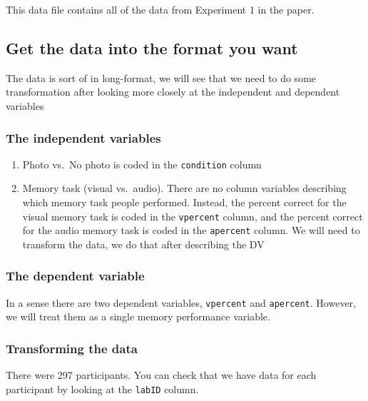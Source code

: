 \documentclass[
]{book}
\providecommand{\tightlist}{%
  \setlength{\itemsep}{0pt}\setlength{\parskip}{0pt}}
\begin{document}
This data file contains all of the data from Experiment 1 in the paper.

\hypertarget{get-the-data-into-the-format-you-want-1}{%
\subsection{Get the data into the format you want}\label{get-the-data-into-the-format-you-want-1}}

The data is sort of in long-format, we will see that we need to do some transformation after looking more closely at the independent and dependent variables

\hypertarget{the-independent-variables-1}{%
\subsubsection{The independent variables}\label{the-independent-variables-1}}

\begin{enumerate}
\def\labelenumi{\arabic{enumi}.}
\tightlist
\item
  Photo vs.~No photo is coded in the \texttt{condition} column
\item
  Memory task (visual vs.~audio). There are no column variables describing which memory task people performed. Instead, the percent correct for the visual memory task is coded in the \texttt{vpercent} column, and the percent correct for the audio memory task is coded in the \texttt{apercent} column. We will need to transform the data, we do that after describing the DV
\end{enumerate}

\hypertarget{the-dependent-variable-1}{%
\subsubsection{The dependent variable}\label{the-dependent-variable-1}}

In a sense there are two dependent variables, \texttt{vpercent} and \texttt{apercent}. However, we will treat them as a single memory performance variable.

\hypertarget{transforming-the-data}{%
\subsubsection{Transforming the data}\label{transforming-the-data}}

There were 297 participants. You can check that we have data for each participant by looking at the \texttt{labID} column.
\end{document}
